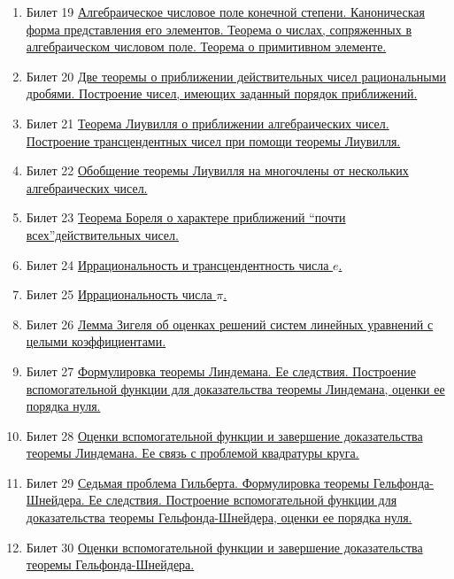 \documentclass[a4paper,12pt]{article}
\begin{document}
\begin{enumerate}
\item{Билет 19}
\hyperlink{bil19}{Алгебраическое числовое поле конечной степени. Каноническая форма представления его элементов. Теорема о числах, сопряженных в алгебраическом числовом поле. Теорема о примитивном элементе.}


\item{Билет 20}
\hyperlink{bil20}{Две теоремы о приближении действительных чисел рациональными дробями. Построение чисел, имеющих заданный порядок приближений.}

\item{Билет 21}
\hyperlink{bil21}{Теорема Лиувилля о приближении алгебраических чисел. Построение трансцендентных чисел при помощи теоремы Лиувилля.}


\item{Билет 22}
\hyperlink{bil22}{Обобщение теоремы Лиувилля на многочлены от нескольких алгебраических чисел.}


\item{Билет 23}
\hyperlink{bil23}{Теорема Бореля о характере приближений \textquotedblleft  почти всех\textquotedblright  действительных чисел.}

\item{Билет 24}
\hyperlink{bil24}{Иррациональность и трансцендентность числа $e$.}


\item{Билет 25}
\hyperlink{bil25}{Иррациональность числа $\pi$.}

\item{Билет 26}
\hyperlink{bil26}{Лемма Зигеля об оценках решений систем линейных уравнений с целыми коэффициентами.}

\item{Билет 27}
\hyperlink{bil27}{Формулировка теоремы Линдемана. Ее следствия. Построение вспомогательной функции для доказательства теоремы Линдемана, оценки ее порядка нуля.}

\item{Билет 28}
\hyperlink{bil28}{Оценки вспомогательной функции и завершение доказательства теоремы Линдемана. Ее связь с проблемой квадратуры круга.}

\item{Билет 29}
\hyperlink{bil29}{Седьмая проблема Гильберта. Формулировка теоремы Гельфонда-Шнейдера. Ее следствия. Построение вспомогательной функции для доказательства теоремы Гельфонда-Шнейдера, оценки ее порядка нуля.}

\item{Билет 30}
\hyperlink{bil30}{Оценки вспомогательной функции и завершение доказательства теоремы Гельфонда-Шнейдера.}


\end{enumerate}
\end{document}
